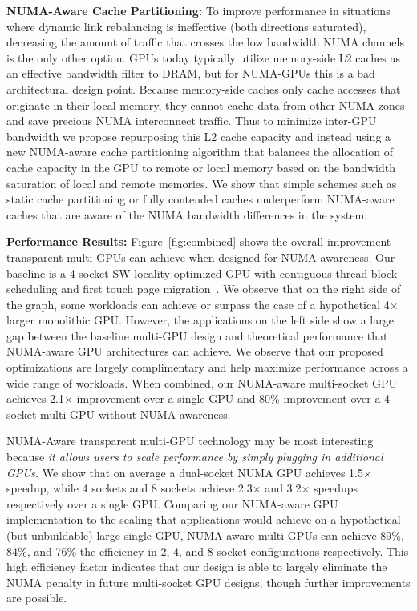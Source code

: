 \documentclass{sig-alternate}
\begin{document}
\textbf{NUMA-Aware Cache Partitioning:} To improve performance in situations 
where dynamic link rebalancing is ineffective (both directions saturated), 
decreasing the amount of traffic that crosses the low bandwidth NUMA channels is 
the only other option. GPUs today typically utilize memory-side L2 caches as an effective 
bandwidth filter to DRAM, but for NUMA-GPUs this is a bad architectural design point. 
Because memory-side caches only cache accesses that originate in their local 
memory, they cannot cache data from other NUMA zones and save precious NUMA 
interconnect traffic. Thus to minimize inter-GPU bandwidth we propose repurposing 
this L2 cache capacity and instead using a new
NUMA-aware cache partitioning algorithm that balances the allocation of cache capacity
in the GPU to remote or local memory based on the bandwidth saturation of local
and remote memories.  We show that simple schemes such as static cache partitioning
or fully contended caches underperform NUMA-aware caches that are aware of the NUMA
bandwidth differences in the system.

\textbf{Performance Results: }Figure~\ref{fig:combined} shows the overall 
improvement transparent multi-GPUs can achieve when designed for NUMA-awareness. 
Our baseline is a 4-socket SW locality-optimized GPU with contiguous 
thread block scheduling and first touch page migration~\cite{Arunkumar2017}. We 
observe that on the right side of the graph, some workloads can achieve or 
surpass the case of a hypothetical 4$\times$ larger monolithic GPU. However, the 
applications on the left side show a large gap between the baseline multi-GPU design 
and theoretical performance that NUMA-aware GPU architectures can achieve.  
We observe that our proposed optimizations are largely complimentary and help maximize 
performance across a wide range of workloads. When 
combined, our NUMA-aware multi-socket GPU achieves 2.1$\times$ improvement over a 
single GPU and 80\% improvement over a 4-socket multi-GPU without NUMA-awareness.

NUMA-Aware transparent multi-GPU technology may be most interesting because 
\textit{it allows users to scale performance by simply plugging in additional 
GPUs.} We show that on average a dual-socket NUMA GPU achieves 1.5$\times$ 
speedup, while 4 sockets and 8 sockets achieve 2.3$\times$ and 3.2$\times$ 
speedups respectively over a single GPU. Comparing our NUMA-aware GPU 
implementation to the scaling that applications would achieve on a hypothetical 
(but unbuildable) large single GPU, NUMA-aware multi-GPUs can achieve 89\%, 
84\%, and 76\% the efficiency in 2, 4, and 8 
socket configurations respectively. This high efficiency factor indicates that 
our design is able to largely eliminate the NUMA penalty in future multi-socket 
GPU designs, though further improvements are possible.
\end{document}
